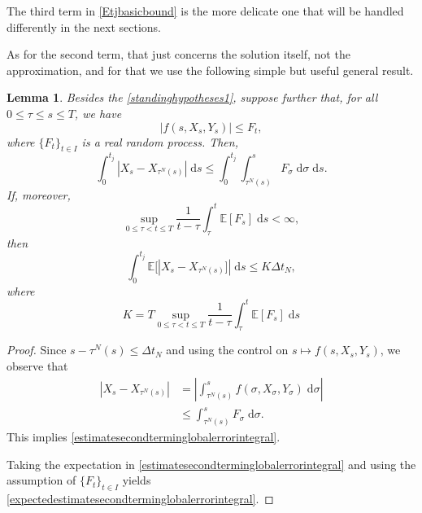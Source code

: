 \documentclass[reqno,12pt]{amsart}
\theoremstyle{plain}%
\newtheorem{lem}{Lemma}[section]
\theoremstyle{definition}
\begin{document}
The third term in \eqref{Etjbasicbound} is the more delicate one that will be handled differently in the next sections.

As for the second term, that just concerns the solution itself, not the approximation, and for that we use the following simple but useful general result.

\begin{lem}
    \label{estimatesecondterminglobalerror}
    Besides the \cref{standinghypotheses1}, suppose further that, for all $0 \leq \tau \leq s \leq T$, we have
    \begin{equation}
        \label{Ftcondition}
      |f(s, X_s, Y_s)| \leq F_t,
    \end{equation}
    where $\{F_t\}_{t\in I}$ is a real random process. Then,
    \begin{equation}
        \label{estimatesecondterminglobalerrorintegral}
        \int_0^{t_j} |X_s - X_{\tau^N(s)}| \;\mathrm{d}s \leq \int_0^{t_j} \int_{\tau^N(s)}^s F_\sigma \;\mathrm{d}\sigma \;\mathrm{d}s.
    \end{equation}
    If, moreover,
    \begin{equation}
        \sup_{0 \leq \tau < t \leq T}\frac{1}{t - \tau}\int_\tau^t \mathbb{E}[F_s]\;\mathrm{d}s < \infty,
    \end{equation}
    then
    \begin{equation}
        \label{expectedestimatesecondterminglobalerrorintegral}
        \int_0^{t_j} \mathbb{E}[|X_s - X_{\tau^N(s)}]| \;\mathrm{d}s \leq K \Delta t_N,
    \end{equation}
    where
    \begin{equation}
      \label{Kconstantinestimatesecondterminglobalerror}
        K = T\sup_{0 \leq \tau < t \leq T}\frac{1}{t - \tau}\int_\tau^t \mathbb{E}[F_s]\;\mathrm{d}s
    \end{equation}
\end{lem}

\begin{proof}
    Since $s - \tau^N(s) \leq \Delta t_N$ and using the control on $s \mapsto f(s, X_s, Y_s)$, we observe that
    \begin{align*}
      \left|X_s - X_{\tau^N(s)}\right| & = \left|\int_{\tau^N(s)}^s f(\sigma, X_\sigma, Y_\sigma)\;\mathrm{d}\sigma\right| \\
      & \leq \int_{\tau^N(s)}^s F_\sigma \;\mathrm{d}\sigma.
    \end{align*}
    This implies \eqref{estimatesecondterminglobalerrorintegral}.

    Taking the expectation in \eqref{estimatesecondterminglobalerrorintegral} and using the assumption of $\{F_t\}_{t\in I}$ yields \eqref{expectedestimatesecondterminglobalerrorintegral}.
\end{proof}
\end{document}
